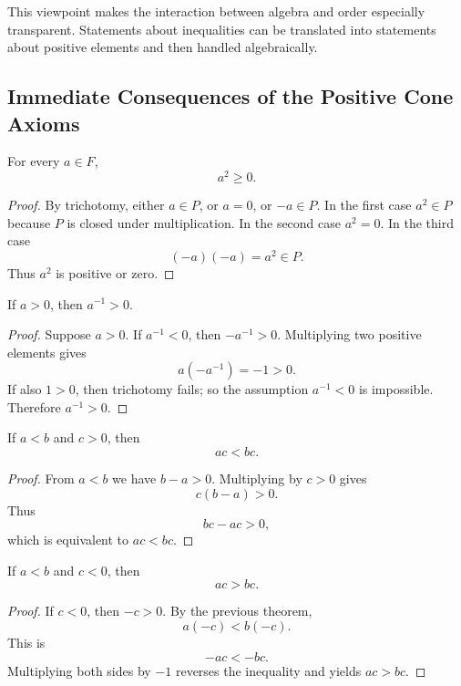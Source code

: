 \begin{remark}
This viewpoint makes the interaction between algebra and order especially transparent.  Statements
about inequalities can be translated into statements about positive elements and then handled
algebraically.
\end{remark}

\subsection{Immediate Consequences of the Positive Cone Axioms}

\begin{theorem}
\label{thm:squares-nonnegative}
For every $a\in F$,
\[
a^2\ge 0.
\]
\end{theorem}

\begin{proof}
By trichotomy, either $a\in P$, or $a=0$, or $-a\in P$.  In the first case $a^2\in P$ because
$P$ is closed under multiplication.  In the second case $a^2=0$.  In the third case
\[
(-a)(-a)=a^2\in P.
\]
Thus $a^2$ is positive or zero.
\end{proof}

\begin{theorem}
\label{thm:inverse-positive}
If $a>0$, then $a^{-1}>0$.
\end{theorem}

\begin{proof}
Suppose $a>0$.  If $a^{-1}<0$, then $-a^{-1}>0$.  Multiplying two positive elements gives
\[
a(-a^{-1})=-1>0.
\]
If also $1>0$, then trichotomy fails; so the assumption $a^{-1}<0$ is impossible.  Therefore
$a^{-1}>0$.
\end{proof}

\begin{theorem}
\label{thm:multiply-positive}
If $a<b$ and $c>0$, then
\[
ac<bc.
\]
\end{theorem}

\begin{proof}
From $a<b$ we have $b-a>0$.  Multiplying by $c>0$ gives
\[
c(b-a)>0.
\]
Thus
\[
bc-ac>0,
\]
which is equivalent to $ac<bc$.
\end{proof}

\begin{theorem}
\label{thm:multiply-negative}
If $a<b$ and $c<0$, then
\[
ac>bc.
\]
\end{theorem}

\begin{proof}
If $c<0$, then $-c>0$.  By the previous theorem,
\[
a(-c)<b(-c).
\]
This is
\[
-ac<-bc.
\]
Multiplying both sides by $-1$ reverses the inequality and yields $ac>bc$.
\end{proof}

